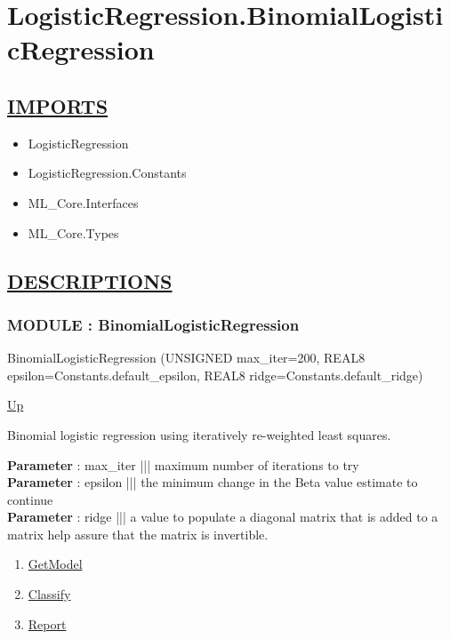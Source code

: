 \chapter*{LogisticRegression.BinomialLogisticRegression}
\hypertarget{ecldoc:toc:LogisticRegression.BinomialLogisticRegression}{}

\section*{\underline{IMPORTS}}
\begin{itemize}
\item LogisticRegression
\item LogisticRegression.Constants
\item ML\_Core.Interfaces
\item ML\_Core.Types
\end{itemize}

\section*{\underline{DESCRIPTIONS}}
\subsection*{MODULE : BinomialLogisticRegression}
\hypertarget{ecldoc:logisticregression.binomiallogisticregression}{}
\begin{minipage}[t]{\textwidth}
\begin{flushleft}
 BinomialLogisticRegression (UNSIGNED max\_iter=200, REAL8 epsilon=Constants.default\_epsilon, REAL8 ridge=Constants.default\_ridge)
\end{flushleft}
\end{minipage}
\hyperlink{ecldoc:toc:LogisticRegression}{Up}

\par
Binomial logistic regression using iteratively re-weighted least squares.
\par
\textbf{Parameter} : max\_iter ||| maximum number of iterations to try \\
\textbf{Parameter} : epsilon ||| the minimum change in the Beta value estimate to continue \\
\textbf{Parameter} : ridge ||| a value to populate a diagonal matrix that is added to a matrix help assure that the matrix is invertible. \\
\begin{enumerate}
\item \hyperlink{ecldoc:logisticregression.binomiallogisticregression.getmodel}{GetModel}
\item \hyperlink{ecldoc:logisticregression.binomiallogisticregression.classify}{Classify}
\item \hyperlink{ecldoc:logisticregression.binomiallogisticregression.report}{Report}
\end{enumerate}
